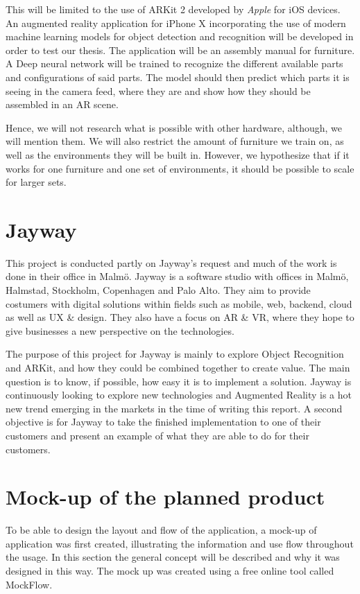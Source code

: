 This will be limited to the use of ARKit 2 developed by \textit{Apple} for iOS devices. An augmented reality application for iPhone X incorporating the use of modern machine learning models for object detection and recognition will be developed in order to test our thesis. The application will be an assembly manual for furniture. A Deep neural network will be trained to recognize the different available parts and configurations of said parts.  The model should then predict which parts it is seeing in the camera feed, where they are and show how they should be assembled in an AR scene. 

Hence, we will not research what is possible with other hardware, although, we will mention them. We will also restrict the amount of furniture we train on, as well as the environments they will be built in. However, we hypothesize that if it works for one furniture and one set of environments, it should be possible to scale for larger sets.


\section{Jayway}
\label{subSecJayway}
This project is conducted partly on Jayway's request and much of the work is done in their office in Malmö.
Jayway is a software studio with offices in Malmö, Halmstad, Stockholm, Copenhagen and Palo Alto. They aim to provide costumers with digital solutions  within fields such as mobile, web, backend, cloud as well as UX \& design. They also have a focus on AR \& VR, where they hope to give businesses a new perspective on the technologies.


The purpose of this project for Jayway is mainly to explore Object Recognition  and ARKit, and how they could be combined together to create value. The main question is to know, if possible, how easy it is to implement a solution.
Jayway is continuously looking to explore new technologies and Augmented Reality is a hot new trend emerging in the markets in the time of writing this report.
A second objective is for Jayway to take the finished implementation to one of their customers and
present an example of what they are able to do for their customers.

\section{Mock-up of the planned product}
\label{subSecMockup}
To be able to design the layout and flow of the application, a mock-up of application was first created, illustrating the information and use flow throughout the usage. In this section the general concept will be described and why it was designed in this way. The mock up was created using a free online tool called MockFlow\cite{mockflow}. 

